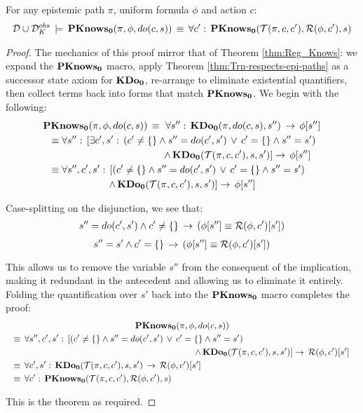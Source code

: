 \begin{thmext}
[\ref{thm:Reg_PKnowsZ}] For any epistemic path $\pi$, uniform
formula $\phi$ and action $c$:\begin{gather*}
\mathcal{D}\cup\mathcal{D}_{K}^{obs}\,\models\,\mathbf{PKnows_{0}}(\pi,\phi,do(c,s))\,\equiv\,\forall c':\,\mathbf{PKnows_{0}}(\mathcal{T}(\pi,c,c'),\mathcal{R}(\phi,c'),s)\end{gather*}

\end{thmext}
\begin{proof}
The mechanics of this proof mirror that of Theorem \ref{thm:Reg_Knows}:
we expand the $\mathbf{PKnows_{0}}$ macro, apply Theorem \ref{thm:Trn-respects-epi-paths}
as a successor state axiom for $\mathbf{KDo_{0}}$, re-arrange to eliminate existential
quantifiers, then collect terms back into forms that match $\mathbf{PKnows_{0}}$.
We begin with the following:\begin{multline*}
\PKnowsZ(\pi,\phi,do(c,s))\,\equiv\,\,\forall s'':\,\KDoZ(\pi,do(c,s),s'')\,\rightarrow\,\phi[s'']\\
\shoveleft{\equiv\forall s'':\,\left[\exists c',s':\,\left(c'\neq\{\}\wedge s''=do(c',s')\,\vee\, c'=\{\}\wedge s''=s'\right)\right.}\\
\shoveright{\left.\wedge\,\KDoZ(\Trn(\pi,c,c'),s,s')\right]\rightarrow\,\phi[s'']}\\
\shoveleft{\equiv\forall s'',c',s':\,\left[\left(c'\neq\{\}\wedge s''=do(c',s')\,\vee\, c'=\{\}\wedge s''=s'\right)\right.}\\
\left.\wedge\,\KDoZ(\Trn(\pi,c,c'),s,s')\right]\rightarrow\,\phi[s'']\end{multline*}


Case-splitting on the disjunction, we see that:\begin{gather*}
s''=do(c',s')\wedge c'\neq\{\}\,\rightarrow\,\left(\phi[s'']\equiv\mathcal{R}(\phi,c')[s']\right)\end{gather*}
 \[
s''=s'\wedge c'=\{\}\,\rightarrow\,\left(\phi[s'']\equiv\mathcal{R}(\phi,c')[s']\right)\]


This allows us to remove the variable $s''$ from the consequent of
the implication, making it redundant in the antecedent and allowing
us to eliminate it entirely. Folding the quantification over $s'$
back into the $\mathbf{PKnows_{0}}$ macro completes the proof:\begin{multline*}
\PKnowsZ(\pi,\phi,do(c,s))\\
\shoveleft{\equiv\,\forall s'',c',s':\,\left[\left(c'\neq\{\}\wedge s''=do(c',s')\,\vee\, c'=\{\}\wedge s''=s'\right)\right.}\\
\shoveright{\left.\wedge\,\KDoZ(\Trn(\pi,c,c'),s,s')\right]\rightarrow\,\Reg(\phi,c')[s']}\\
\shoveleft{\equiv\,\forall c',s':\,\KDoZ(\Trn(\pi,c,c'),s,s')\,\rightarrow\,\Reg(\phi,c')[s']}\\
\shoveleft{\equiv\,\forall c':\,\PKnowsZ(\Trn(\pi,c,c'),\Reg(\phi,c'),s)}\,\,\,\,\,\,\,\,\,\,\,\,\,\,\,\,\,\,\,\,\,\,\,\,\,\,\,\,\,\,\,\,\,\,\,\,\,\,\,\,\,\,\,\,\,\,\,\,\,\,\,\,\,\,\,\,\,\,\,\,\,\,\,\,\,\,\,\,\,\,\,\,\,\,\,\,\,\,\,\,\,\,\,\,\,\,\,\,\,\,\,\,\,\,\,\,\,\,\,\,\,\,\,\,\,\,\,\,\,\,\,\,\,\,\,\,\,\,\,\,\,\,\,\,\,\,\,\end{multline*}


This is the theorem as required. 
\end{proof}

